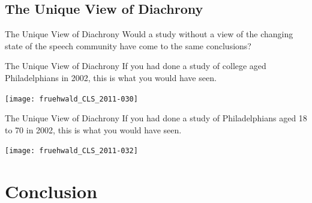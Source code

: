 \documentclass[]{beamer}
\begin{document}
\subsection{The Unique View of Diachrony}



\begin{frame}{The Unique View of Diachrony}
	Would a study without a view of the changing state of the speech community have come
	to the same conclusions?

\end{frame}

\begin{frame}{The Unique View of Diachrony}
	If you had done a study of college aged Philadelphians in 2002, this is what you would have seen.
	
\texttt{[image: fruehwald\_CLS\_2011-030]}
\end{frame}


\begin{frame}{The Unique View of Diachrony}
If you had done a study of Philadelphians aged 18 to 70 in 2002, this is what you would have seen.
	
\texttt{[image: fruehwald\_CLS\_2011-032]}
\end{frame}



\section{Conclusion}
\end{document}
